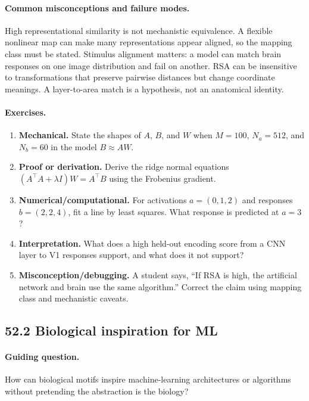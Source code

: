 \paragraph{Common misconceptions and failure modes.}
High representational similarity is not mechanistic equivalence. A flexible nonlinear map can make many representations appear aligned, so the mapping class must be stated. Stimulus alignment matters: a model can match brain responses on one image distribution and fail on another. RSA can be insensitive to transformations that preserve pairwise distances but change coordinate meanings. A layer-to-area match is a hypothesis, not an anatomical identity.

\paragraph{Exercises.}
\begin{enumerate}[label=\textbf{52.1.\arabic*.}, leftmargin=*]
\item \textbf{Mechanical.} State the shapes of \(A\), \(B\), and \(W\) when \(M=100\), \(N_a=512\), and \(N_b=60\) in the model \(B\approx AW\).
\item \textbf{Proof or derivation.} Derive the ridge normal equations \((A^\top A+\lambda I)W=A^\top B\) using the Frobenius gradient.
\item \textbf{Numerical/computational.} For activations \(a=(0,1,2)\) and responses \(b=(2,2,4)\), fit a line by least squares. What response is predicted at \(a=3\)?
\item \textbf{Interpretation.} What does a high held-out encoding score from a CNN layer to V1 responses support, and what does it not support?
\item \textbf{Misconception/debugging.} A student says, ``If RSA is high, the artificial network and brain use the same algorithm.'' Correct the claim using mapping class and mechanistic caveats.
\end{enumerate}

\subsection{52.2 Biological inspiration for ML}

\paragraph{Guiding question.}
How can biological motifs inspire machine-learning architectures or algorithms without pretending the abstraction is the biology?

